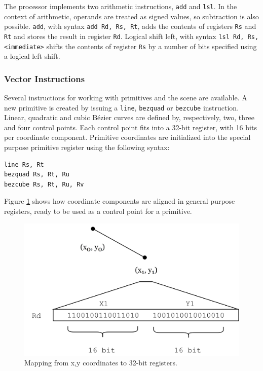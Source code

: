 The processor implements two arithmetic instructions, \texttt{add} and \texttt{lsl}.
In the context of arithmetic, operands are treated as signed values, so subtraction is also possible.
\texttt{add}, with syntax \texttt{add Rd, Rs, Rt}, adds the contents of registers \texttt{Rs} and \texttt{Rt} and stores the result in register \texttt{Rd}.
Logical shift left, with syntax \texttt{lsl Rd, Rs, <immediate>} shifts the contents of register \texttt{Rs} by a number of bits specified using a logical left shift.

\subsubsection{Vector Instructions}

Several instructions for working with primitives and the scene are available.
A new primitive is created by issuing a \texttt{line}, \texttt{bezquad} or \texttt{bezcube} instruction.
Linear, quadratic and cubic Bézier curves are defined by, respectively, two, three and four control points.
Each control point fits into a 32-bit register, with 16 bits per coordinate component.
Primitive coordinates are initialized into the special purpose primitive register using the following syntax:

\begin{lstlisting}[label=lst:primitive-initialization]
line Rs, Rt
bezquad Rs, Rt, Ru
bezcube Rs, Rt, Ru, Rv
\end{lstlisting}

Figure \ref{fig:primitive-data-mapping} shows how coordinate components are aligned in general purpose registers, ready to be used as a control point for a primitive.

\begin{figure}[H]
    \includegraphics[width=\linewidth]{images/primitive-data-mapping.png}
    \caption{Mapping from x,y coordinates to 32-bit registers.}
    \label{fig:primitive-data-mapping}
\end{figure}

